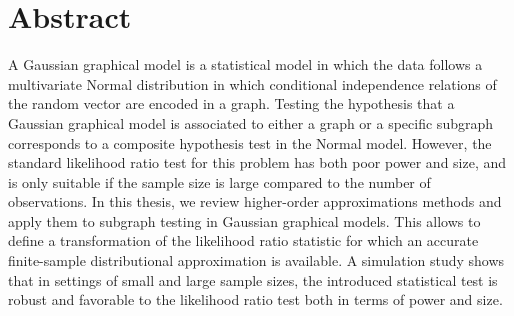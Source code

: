 \section*{Abstract}

A Gaussian graphical model is a statistical model in which the data follows a multivariate Normal distribution in which conditional independence relations of the random vector are encoded in a graph. Testing the hypothesis that a Gaussian graphical model is associated to either a graph or a specific subgraph corresponds to a composite hypothesis test in the Normal model. However, the standard likelihood ratio test for this problem has both poor power and size, and is only suitable if the sample size is large compared to the number of observations. In this thesis, we review higher-order approximations methods and apply them to subgraph testing in Gaussian graphical models. This allows to define a transformation of the likelihood ratio statistic for which an accurate finite-sample distributional approximation is available. A simulation study shows that in settings of small and large sample sizes, the introduced statistical test is robust and favorable to the likelihood ratio test both in terms of power and size.